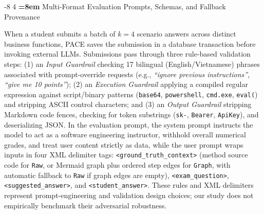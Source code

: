 \documentclass{llncs}
\makeatletter
\renewcommand\subsection{\@startsection{subsection}{2}{\z@}%
                       {-8\p@ \@plus -2\p@ \@minus -2\p@}%
                       {4\p@ \@plus 1\p@ \@minus 1\p@}%
                       {\normalfont\normalsize\bfseries\boldmath
                        \rightskip=\z@ \@plus 8em\pretolerance=10000 }}
\makeatother
\begin{document}
\subsection{Multi-Format Evaluation Prompts, Schemas, and Fallback Provenance}

When a student submits a batch of $k = 4$ scenario answers across distinct business functions, PACE saves the submission in a database transaction before invoking external LLMs. Submissions pass through three rule-based validation steps: (1) an \emph{Input Guardrail} checking 17 bilingual (English/Vietnamese) phrases associated with prompt-override requests (e.g., \emph{``ignore previous instructions''}, \emph{``give me 10 points''}); (2) an \emph{Execution Guardrail} applying a compiled regular expression against script/binary patterns (\texttt{base64}, \texttt{powershell}, \texttt{cmd.exe}, \texttt{eval(}) and stripping ASCII control characters; and (3) an \emph{Output Guardrail} stripping Markdown code fences, checking for token substrings (\texttt{sk-}, \texttt{Bearer}, \texttt{ApiKey}), and deserializing JSON. In the evaluation prompt, the system prompt instructs the model to act as a software engineering instructor, withhold overall numerical grades, and treat user content strictly as data, while the user prompt wraps inputs in four XML delimiter tags: \texttt{<ground\_truth\_context>} (method source code for \texttt{Raw}, or Mermaid graph plus ordered step edges for \texttt{Graph}, with automatic fallback to \texttt{Raw} if graph edges are empty), \texttt{<exam\_question>}, \texttt{<suggested\_answer>}, and \texttt{<student\_answer>}. These rules and XML delimiters represent prompt-engineering and validation design choices; our study does not empirically benchmark their adversarial robustness.
\end{document}

